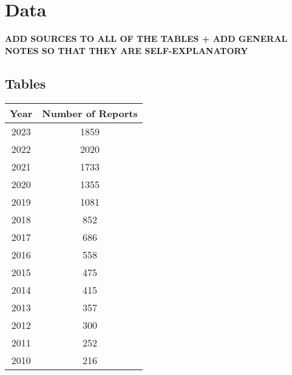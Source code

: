 \documentclass[12pt]{article}
\begin{document}

\pagebreak
\printbibliography{}
\pagebreak
\appendix

\section{Data}\label{app:data}

\textbf{ADD SOURCES TO ALL OF THE TABLES + ADD GENERAL NOTES SO THAT THEY ARE SELF-EXPLANATORY}

\subsection{Tables}
\small
\centering

\begin{table}[h]
    \label{tab:sust_reps}
    \centering
        \begin{tabular}{cc}
            \toprule
            Year & Number of Reports\\
            \midrule
            2023 & 1859\\
            2022 & 2020\\
            2021 & 1733\\
            2020 & 1355\\
            2019 & 1081\\
            2018 & 852\\
            2017 & 686\\
            2016 & 558\\
            2015 & 475\\
            2014 & 415\\
            2013 & 357\\
            2012 & 300\\
            2011 & 252\\
            2010 & 216\\
            \bottomrule
        \end{tabular}
\end{table}

\pagebreak
\end{document}
